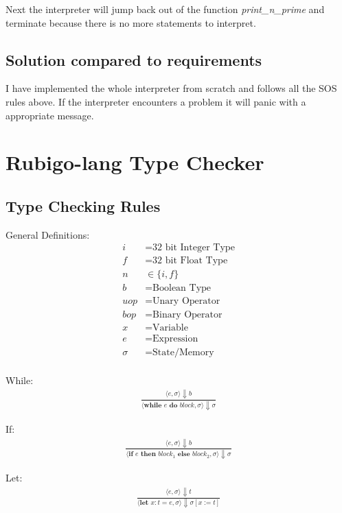 \documentclass[12pt]{article}
\begin{document}
	Next the interpreter will jump back out of the function \emph{print\_n\_prime} and terminate because there is no more statements to interpret.



    \subsection{Solution compared to requirements}
	I have implemented the whole interpreter from scratch and follows all the SOS rules above. If the interpreter encounters a problem it will panic with a appropriate message. 



    \section{Rubigo-lang Type Checker}	
    	\subsection{Type Checking Rules}
	General Definitions:
    	\begin{align*}
		i &= \text{32 bit Integer Type} \\
		f &= \text{32 bit Float Type} \\
		n &\in \{i, f\} \\
		b &= \text{Boolean Type} \\
		uop &= \text{Unary Operator} \\
		bop &= \text{Binary Operator} \\
		x &= \text{Variable} \\
		e &= \text{Expression} \\
		\sigma &= \text{State/Memory} \\
	\end{align*}

	While:
	\begin{align*}
		\frac{\langle e, \sigma \rangle\Downarrow b}
		{\langle \textbf{while } e \textbf{ do } block, \sigma \rangle\Downarrow \sigma}
	\end{align*}

	If:
	\begin{align*}
		\frac{\langle e, \sigma \rangle\Downarrow b}
		{\langle \textbf{if } e \textbf{ then } block_1 \textbf{ else } block_2, \sigma \rangle\Downarrow \sigma}
	\end{align*}

	Let:
	\begin{align*}
		\frac{\langle e, \sigma \rangle\Downarrow t}
		{\langle \textbf{let } x: t = e, \sigma \rangle\Downarrow \sigma [x := t]}
	\end{align*}
\end{document}

